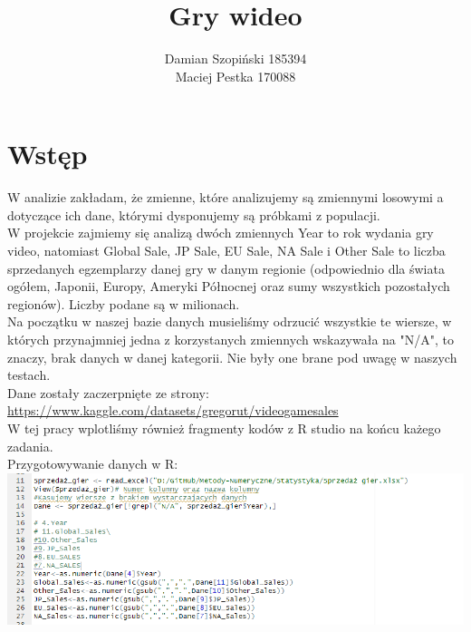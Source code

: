 \documentclass[12pt]{article}
\author{
Damian Szopiński 185394\\
Maciej Pestka 170088
}
\title{Gry wideo}
\begin{document}
	\maketitle
	\section{Wstęp}
	W analizie zakładam, że zmienne, które analizujemy są zmiennymi losowymi a dotyczące ich dane, którymi dysponujemy są próbkami z populacji.\\
	W projekcie zajmiemy się analizą dwóch zmiennych Year to rok wydania gry video, natomiast Global Sale, JP Sale, EU Sale, NA Sale i Other Sale to liczba sprzedanych egzemplarzy danej gry w danym regionie (odpowiednio dla świata ogółem, Japonii, Europy, Ameryki Północnej oraz sumy wszystkich pozostałych regionów). Liczby podane są w milionach.\\
	Na początku w naszej bazie danych musieliśmy odrzucić wszystkie te wiersze, w których przynajmniej jedna z korzystanych zmiennych wskazywała na "N/A", to znaczy, brak danych w danej kategorii. Nie były one brane pod uwagę w naszych testach.\\
Dane zostały zaczerpnięte ze strony:\\
\url{https://www.kaggle.com/datasets/gregorut/videogamesales}\\
W tej pracy wplotliśmy również fragmenty kodów z R studio na końcu każego zadania.\\
	Przygotowywanie danych w R:\\
	\includegraphics[scale=0.6]{Zad0}
	\newpage
	
\end{document}
